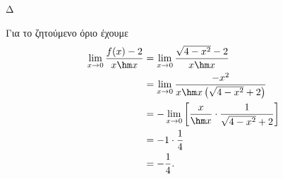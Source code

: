 \begin{thema}{Δ}
\begin{erwthma}
Για το ζητούμενο όριο έχουμε
\begin{align*}
\lim_{x\to0}\frac{f(x)-2}{x\hm x}
&=\lim_{x\to0}
\frac{\sqrt{4-x^2}-2}{x\hm x}\\
&=\lim_{x\to0}
\frac{-x^2}
{x\hm x\left(\sqrt{4-x^2}+2\right)}\\
&=-\lim_{x\to0}
\left[
\frac{x}{\hm x}\cdot
\frac{1}{\sqrt{4-x^2}+2}
\right]\\
&=-1\cdot\frac14\\
&={-\frac14}.
\end{align*}
\end{erwthma}
\end{thema}
